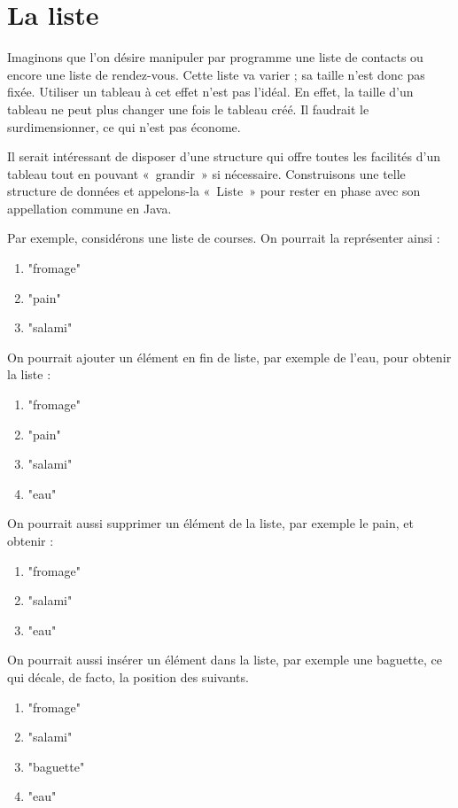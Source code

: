 \chapter{La liste}

	
	Imaginons que l’on désire manipuler par programme une liste de contacts ou
	encore une liste de rendez-vous. Cette liste va varier ; sa taille
	n’est donc pas fixée. Utiliser un tableau à cet effet n’est pas l’idéal. 
	En effet, la taille d’un tableau ne peut plus changer une fois le tableau créé. 
	Il faudrait le surdimensionner, ce qui n’est pas économe.
	
	Il serait intéressant de disposer d’une structure qui offre toutes les
	facilités d’un tableau tout en pouvant «~grandir~» si nécessaire.
	Construisons une telle structure de données et appelons-la «~Liste~»
	pour rester en phase avec son appellation commune en Java.
	
	Par exemple, considérons une liste de courses.
	On pourrait la représenter ainsi :
	\begin{enumerate}
	\item "fromage"
	\item "pain"
	\item "salami"
	\end{enumerate}
	
	On pourrait ajouter un élément en fin de liste, par exemple de l'eau,
	pour obtenir la liste :
	
	\begin{enumerate}
	\item "fromage"
	\item "pain"
	\item "salami"
	\item "eau"
	\end{enumerate}
	
	On pourrait aussi supprimer un élément de la liste, par exemple le pain,
	et obtenir :
	
	\begin{enumerate}
	\item "fromage"
	\item "salami"
	\item "eau"
	\end{enumerate}
	
	On pourrait aussi insérer un élément dans la liste, 
	par exemple une baguette, 
	ce qui décale, de facto, la position des suivants.
	
	\begin{enumerate}
	\item "fromage"
	\item "salami"
	\item "baguette"
	\item "eau"
	\end{enumerate}
	
